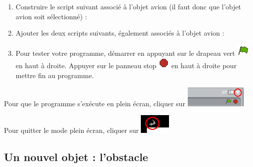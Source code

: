 
\vspace{12pt}



\begin{enumerate}
\item Construire le script suivant associé à l'objet avion (il faut donc que l'objet avion soit sélectionné) :
\item Ajouter les deux scripts suivants, également associés à l'objet avion :
\item Pour tester votre programme, démarrer en appuyant sur le drapeau vert \includegraphics[width=.7cm]{./images/scratch/DrapeauVert} en haut à droite. Appuyer sur le panneau stop \includegraphics[width=.7cm]{./images/scratch/Stop} en haut à droite pour mettre fin au programme.
\end{enumerate}

Pour que le programme s'exécute en plein écran, cliquer sur \includegraphics[width=3cm]{./images/scratch/ScratchPleinEcran}

Pour quitter le mode plein écran, cliquer sur \includegraphics[width=1.5cm]{./images/scratch/ScratchQuitterPleinEcran}


\subsection{Un nouvel objet : l'obstacle}       

